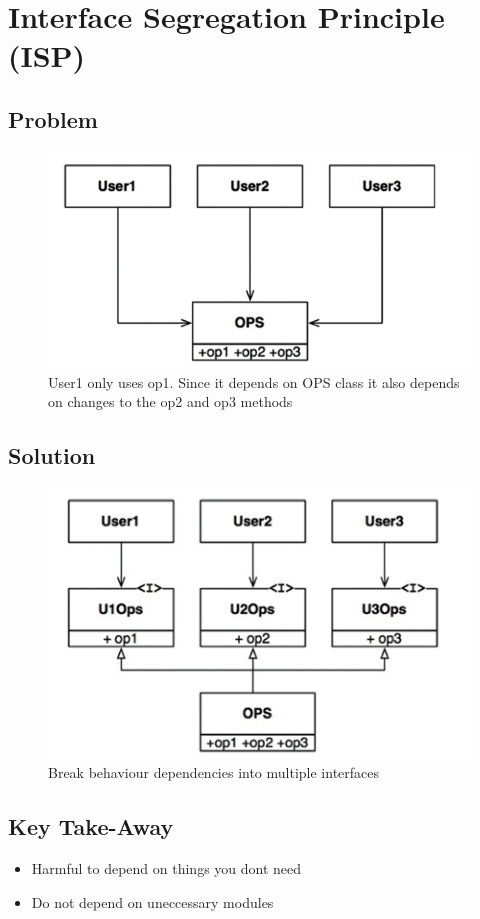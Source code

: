 \documentclass[../Main.tex]{subfiles}
\begin{document}
\section{Interface Segregation Principle (ISP)}
\subsection{Problem}
\begin{figure}[H]
    \centering
    \includegraphics[width=0.75\linewidth]{Images/cleanarch/isp-example-1.png}
    \caption{User1 only uses op1. Since it depends on OPS class it also depends on changes to the op2 and op3 methods}
\end{figure}

\subsection{Solution}
\begin{figure}[H]
    \centering
    \includegraphics[width=0.75\linewidth]{Images/cleanarch/isp-solution.png}
    \caption{Break behaviour dependencies into multiple interfaces}
\end{figure}

\subsection{Key Take-Away}
\begin{itemize}
    \item Harmful to depend on things you dont need
    \item Do not depend on uneccessary modules
\end{itemize}
\end{document}
